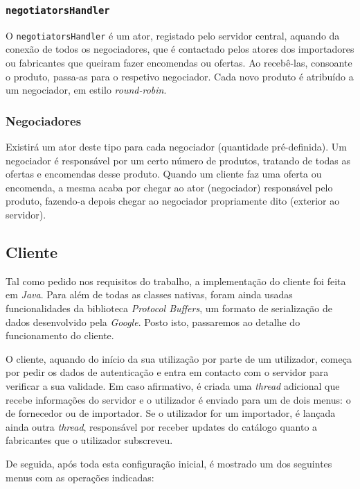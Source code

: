 \documentclass[a4paper]{report}
\begin{document}
	\subsubsection{\texttt{negotiatorsHandler}}
	O \texttt{negotiatorsHandler} é um ator, registado pelo servidor central, aquando da conexão de todos os negociadores, que é contactado pelos atores dos importadores ou fabricantes que queiram fazer encomendas ou ofertas. 
	Ao recebê-las, consoante o produto, passa-as para o respetivo negociador. Cada novo produto é atribuído a um negociador, em estilo \textit{round-robin}.

	\subsubsection{Negociadores}
	Existirá um ator deste tipo para cada negociador (quantidade pré-definida). Um negociador é responsável por um certo número de produtos, tratando de todas as ofertas e encomendas desse produto.
	Quando um cliente faz uma oferta ou encomenda, a mesma acaba por chegar ao ator (negociador) responsável pelo produto, fazendo-a depois chegar ao negociador propriamente dito (exterior ao servidor).

	\subsection{Cliente}
	Tal como pedido nos requisitos do trabalho, a implementação do cliente foi feita em \textit{Java}. Para além de todas as classes nativas, foram ainda usadas funcionalidades da biblioteca \textit{Protocol Buffers}, um formato de serialização de dados desenvolvido pela \textit{Google}. Posto isto, passaremos ao detalhe do funcionamento do cliente.
	
	O cliente, aquando do início da sua utilização por parte de um utilizador, começa por pedir os dados de autenticação e entra em contacto com o servidor para verificar a sua validade. Em caso afirmativo, é criada uma \textit{thread} adicional que recebe informações do servidor e o utilizador é enviado para um de dois menus: o de fornecedor ou de importador. Se o utilizador for um importador, é lançada ainda outra \textit{thread}, responsável por receber updates do catálogo quanto a fabricantes que o utilizador subscreveu.
	
	De seguida, após toda esta configuração inicial, é mostrado um dos seguintes menus com as operações indicadas:
	
\end{document}
